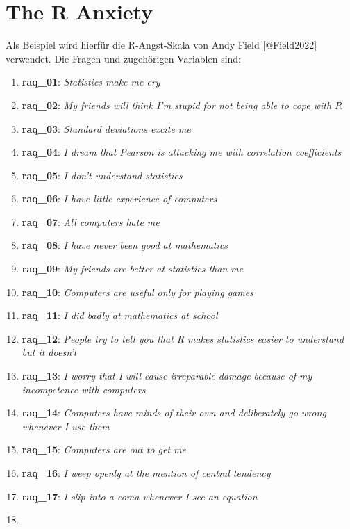 \documentclass[
  10pt,
  letterpaper,
  a4paper, twoside]{scrreprt}
\providecommand{\tightlist}{%
  \setlength{\itemsep}{0pt}\setlength{\parskip}{0pt}}\usepackage{longtable,booktabs,array}
\begin{document}
\section{The R Anxiety}\label{the-r-anxiety}

Als Beispiel wird hierfür die R-Angst-Skala von Andy Field
{[}@Field2022{]} verwendet. Die Fragen und zugehörigen Variablen sind:

\begin{enumerate}
\def\labelenumi{\arabic{enumi}.}
\tightlist
\item
  \textbf{raq\_01}: \emph{Statistics make me cry}
\item
  \textbf{raq\_02}: \emph{My friends will think I'm stupid for not being
  able to cope with R}
\item
  \textbf{raq\_03}: \emph{Standard deviations excite me}
\item
  \textbf{raq\_04}: \emph{I dream that Pearson is attacking me with
  correlation coefficients}
\item
  \textbf{raq\_05}: \emph{I don't understand statistics}
\item
  \textbf{raq\_06}: \emph{I have little experience of computers}
\item
  \textbf{raq\_07}: \emph{All computers hate me}
\item
  \textbf{raq\_08}: \emph{I have never been good at mathematics}
\item
  \textbf{raq\_09}: \emph{My friends are better at statistics than me}
\item
  \textbf{raq\_10}: \emph{Computers are useful only for playing games}
\item
  \textbf{raq\_11}: \emph{I did badly at mathematics at school}
\item
  \textbf{raq\_12}: \emph{People try to tell you that R makes statistics
  easier to understand but it doesn't}
\item
  \textbf{raq\_13}: \emph{I worry that I will cause irreparable damage
  because of my incompetence with computers}
\item
  \textbf{raq\_14}: \emph{Computers have minds of their own and
  deliberately go wrong whenever I use them}
\item
  \textbf{raq\_15}: \emph{Computers are out to get me}
\item
  \textbf{raq\_16}: \emph{I weep openly at the mention of central
  tendency}
\item
  \textbf{raq\_17}: \emph{I slip into a coma whenever I see an equation}
\item

\end{enumerate}
\end{document}

